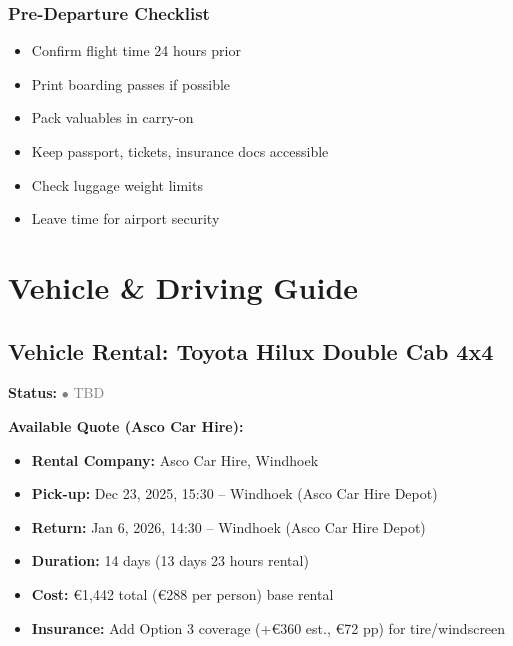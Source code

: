 \documentclass[11pt]{article}
\newcommand{\tbdstatus}{\textcolor{gray}{$\bullet$ TBD}}
\begin{document}
\subsubsection{Pre-Departure Checklist}

\begin{itemize}
    \item Confirm flight time 24 hours prior
    \item Print boarding passes if possible
    \item Pack valuables in carry-on
    \item Keep passport, tickets, insurance docs accessible
    \item Check luggage weight limits
    \item Leave time for airport security
\end{itemize}

\clearpage
\section{Vehicle \& Driving Guide}

\subsection{Vehicle Rental: Toyota Hilux Double Cab 4x4}

\textbf{Status:} \tbdstatus

\textbf{Available Quote (Asco Car Hire):}
\begin{itemize}
    \item \textbf{Rental Company:} Asco Car Hire, Windhoek
    \item \textbf{Pick-up:} Dec 23, 2025, 15:30 -- Windhoek (Asco Car Hire Depot)
    \item \textbf{Return:} Jan 6, 2026, 14:30 -- Windhoek (Asco Car Hire Depot)
    \item \textbf{Duration:} 14 days (13 days 23 hours rental)
    \item \textbf{Cost:} €1,442 total (€288 per person) base rental
    \item \textbf{Insurance:} Add Option 3 coverage (+€360 est., €72 pp) for tire/windscreen
\end{itemize}
\end{document}

